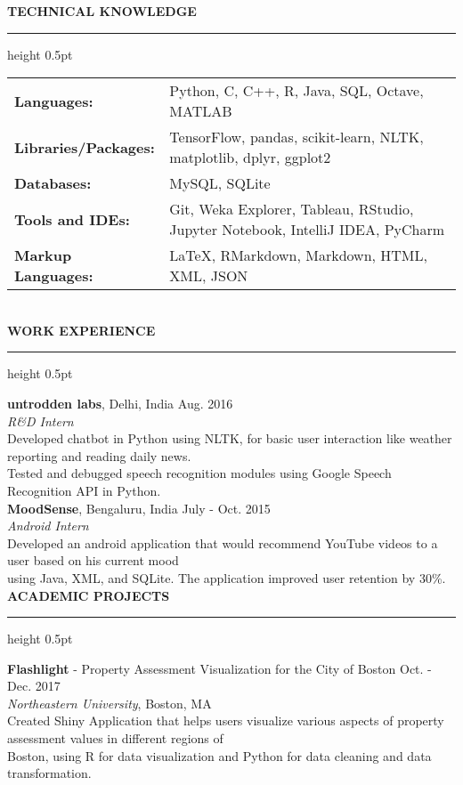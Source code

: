 \documentclass[a4paper]{article}
\newcommand{\myline}{\par
  \kern2pt %
  \hrule height 0.5pt
  \kern2pt %
}
\newcommand{\mybullet}{
	\indent \textbullet \hspace*{2mm}
}
\begin{document}
	\noindent
	{\large \textbf{TECHNICAL KNOWLEDGE}}
	\myline 
	
	\noindent
	\begin{tabular}{ m{3.5cm} l }
		\textbf{Languages: } & Python, C, C++, R, Java, SQL, Octave, MATLAB \\ 
		\textbf{Libraries/Packages: } & TensorFlow, pandas, scikit-learn, NLTK, 
                 matplotlib, dplyr, ggplot2 \\
		\textbf{Databases: } & MySQL, SQLite\\
		\textbf{Tools and IDEs: } & Git, Weka Explorer, Tableau, RStudio, 
                Jupyter Notebook, IntelliJ IDEA, PyCharm\\
		\textbf{Markup Languages: } & LaTeX, RMarkdown, Markdown, HTML, XML, JSON \\
	\end{tabular} \\

	\smallskip
	\smallskip
	\noindent
	{\large \textbf{WORK EXPERIENCE}}
	\myline 
	\smallskip
	
	\noindent
	\textbf{untrodden labs}, Delhi, India \hfill Aug. 2016 \\
        \textit{R\&D Intern}\\
        \mybullet Developed chatbot in Python using NLTK, for basic user interaction like 
        weather reporting and reading daily news. \\
	\mybullet Tested and debugged speech recognition modules using Google Speech 
        Recognition API in Python. \\
	
	\noindent
	\textbf{MoodSense}, Bengaluru, India \hfill July - Oct. 2015 \\
	\textit{Android Intern} \\
	\mybullet Developed an android application that would recommend YouTube videos to a 
        user based on his current mood \\
        \hspace*{9mm} using Java, XML, and SQLite. The 
        application improved user retention by 30\%. \\ 
	
        \noindent
	{\large \textbf{ACADEMIC PROJECTS}}
	\myline 
	\smallskip

        \noindent
        \textbf{Flashlight} - Property Assessment Visualization for the City of Boston 
        \hfill Oct. - Dec. 2017 \\
        \textit{Northeastern University}, Boston, MA \\
        \mybullet Created Shiny Application that helps users visualize various aspects of 
        property assessment values in different regions of \\ \hspace*{9mm} Boston, using 
        R for data visualization and Python for data cleaning and data transformation. \\
        
\end{document}
